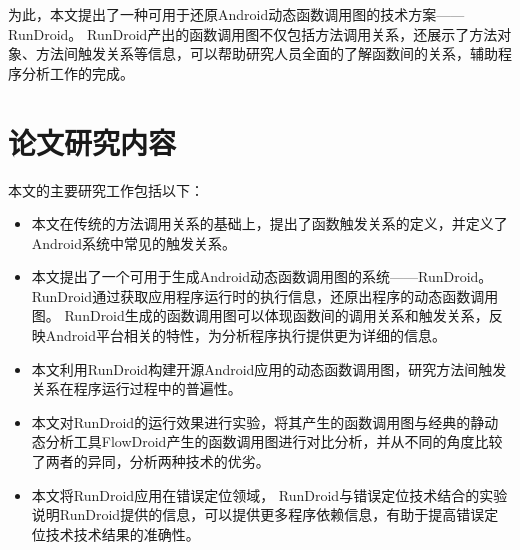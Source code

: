 为此，本文提出了一种可用于还原Android动态函数调用图的技术方案——RunDroid。
RunDroid产出的函数调用图不仅包括方法调用关系，还展示了方法对象、方法间触发关系等信息，可以帮助研究人员全面的了解函数间的关系，辅助程序分析工作的完成。


\section{论文研究内容}
本文的主要研究工作包括以下：
\begin{itemize}
	\setlength{\itemsep}{1pt}
	\setlength{\parskip}{0pt}
	\setlength{\parsep}{0pt}

	\item 本文在传统的方法调用关系的基础上，提出了函数触发关系的定义，并定义了Android系统中常见的触发关系。

	\item  本文提出了一个可用于生成Android动态函数调用图的系统——RunDroid。
	RunDroid通过获取应用程序运行时的执行信息，还原出程序的动态函数调用图。
	RunDroid生成的函数调用图可以体现函数间的调用关系和触发关系，反映Android平台相关的特性，为分析程序执行提供更为详细的信息。
		
		
	\item 本文利用RunDroid构建开源Android应用的动态函数调用图，研究方法间触发关系在程序运行过程中的普遍性。
	
	\item 本文对RunDroid的运行效果进行实验，将其产生的函数调用图与经典的静动态分析工具FlowDroid产生的函数调用图进行对比分析，并从不同的角度比较了两者的异同，分析两种技术的优劣。
	
	\item  本文将RunDroid应用在错误定位领域， RunDroid与错误定位技术结合的实验说明RunDroid提供的信息，可以提供更多程序依赖信息，有助于提高错误定位技术技术结果的准确性。


\end{itemize}



